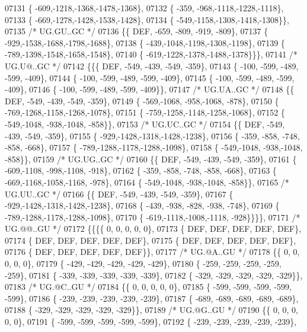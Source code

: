 \begin{DoxyCode}
07131 \{ -609,-1218,-1368,-1478,-1368\},
07132 \{ -359, -968,-1118,-1228,-1118\},
07133 \{ -669,-1278,-1428,-1538,-1428\},
07134 \{ -549,-1158,-1308,-1418,-1308\}\},
07135 \textcolor{comment}{/* UG.GU..GC */}
07136 \{\{  DEF, -659, -809, -919, -809\},
07137 \{ -929,-1538,-1688,-1798,-1688\},
07138 \{ -439,-1048,-1198,-1308,-1198\},
07139 \{ -789,-1398,-1548,-1658,-1548\},
07140 \{ -619,-1228,-1378,-1488,-1378\}\}\},
07141 \textcolor{comment}{/* UG.U@..GC */}
07142 \{\{\{  DEF, -549, -439, -549, -359\},
07143 \{ -100, -599, -489, -599, -409\},
07144 \{ -100, -599, -489, -599, -409\},
07145 \{ -100, -599, -489, -599, -409\},
07146 \{ -100, -599, -489, -599, -409\}\},
07147 \textcolor{comment}{/* UG.UA..GC */}
07148 \{\{  DEF, -549, -439, -549, -359\},
07149 \{ -569,-1068, -958,-1068, -878\},
07150 \{ -769,-1268,-1158,-1268,-1078\},
07151 \{ -759,-1258,-1148,-1258,-1068\},
07152 \{ -549,-1048, -938,-1048, -858\}\},
07153 \textcolor{comment}{/* UG.UC..GC */}
07154 \{\{  DEF, -549, -439, -549, -359\},
07155 \{ -929,-1428,-1318,-1428,-1238\},
07156 \{ -359, -858, -748, -858, -668\},
07157 \{ -789,-1288,-1178,-1288,-1098\},
07158 \{ -549,-1048, -938,-1048, -858\}\},
07159 \textcolor{comment}{/* UG.UG..GC */}
07160 \{\{  DEF, -549, -439, -549, -359\},
07161 \{ -609,-1108, -998,-1108, -918\},
07162 \{ -359, -858, -748, -858, -668\},
07163 \{ -669,-1168,-1058,-1168, -978\},
07164 \{ -549,-1048, -938,-1048, -858\}\},
07165 \textcolor{comment}{/* UG.UU..GC */}
07166 \{\{  DEF, -549, -439, -549, -359\},
07167 \{ -929,-1428,-1318,-1428,-1238\},
07168 \{ -439, -938, -828, -938, -748\},
07169 \{ -789,-1288,-1178,-1288,-1098\},
07170 \{ -619,-1118,-1008,-1118, -928\}\}\}\},
07171 \textcolor{comment}{/* UG.@@..GU */}
07172 \{\{\{\{    0,    0,    0,    0,    0\},
07173 \{  DEF,  DEF,  DEF,  DEF,  DEF\},
07174 \{  DEF,  DEF,  DEF,  DEF,  DEF\},
07175 \{  DEF,  DEF,  DEF,  DEF,  DEF\},
07176 \{  DEF,  DEF,  DEF,  DEF,  DEF\}\},
07177 \textcolor{comment}{/* UG.@A..GU */}
07178 \{\{    0,    0,    0,    0,    0\},
07179 \{ -429, -429, -429, -429, -429\},
07180 \{ -259, -259, -259, -259, -259\},
07181 \{ -339, -339, -339, -339, -339\},
07182 \{ -329, -329, -329, -329, -329\}\},
07183 \textcolor{comment}{/* UG.@C..GU */}
07184 \{\{    0,    0,    0,    0,    0\},
07185 \{ -599, -599, -599, -599, -599\},
07186 \{ -239, -239, -239, -239, -239\},
07187 \{ -689, -689, -689, -689, -689\},
07188 \{ -329, -329, -329, -329, -329\}\},
07189 \textcolor{comment}{/* UG.@G..GU */}
07190 \{\{    0,    0,    0,    0,    0\},
07191 \{ -599, -599, -599, -599, -599\},
07192 \{ -239, -239, -239, -239, -239\},

\end{DoxyCode}
